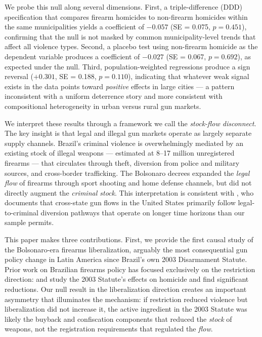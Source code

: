 \documentclass[12pt]{article}
\begin{document}
We probe this null along several dimensions. First, a triple-difference (DDD) specification that compares firearm homicides to non-firearm homicides within the same municipalities yields a coefficient of $-0.057$ (SE = 0.075, $p = 0.451$), confirming that the null is not masked by common municipality-level trends that affect all violence types. Second, a placebo test using non-firearm homicide as the dependent variable produces a coefficient of $-0.027$ (SE = 0.067, $p = 0.692$), as expected under the null. Third, population-weighted regressions produce a sign reversal ($+0.301$, SE = 0.188, $p = 0.110$), indicating that whatever weak signal exists in the data points toward \textit{positive} effects in large cities --- a pattern inconsistent with a uniform deterrence story and more consistent with compositional heterogeneity in urban versus rural gun markets.

We interpret these results through a framework we call the \textit{stock-flow disconnect}. The key insight is that legal and illegal gun markets operate as largely separate supply channels. Brazil's criminal violence is overwhelmingly mediated by an existing stock of illegal weapons --- estimated at 8--17 million unregistered firearms \citep{cerqueira2004, fbsp2022armas} --- that circulates through theft, diversion from police and military sources, and cross-border trafficking. The Bolsonaro decrees expanded the \textit{legal flow} of firearms through sport shooting and home defense channels, but did not directly augment the \textit{criminal stock}. This interpretation is consistent with \citet{knight2013guntrace}, who documents that cross-state gun flows in the United States primarily follow legal-to-criminal diversion pathways that operate on longer time horizons than our sample permits.

This paper makes three contributions. First, we provide the first causal study of the Bolsonaro-era firearms liberalization, arguably the most consequential gun policy change in Latin America since Brazil's own 2003 Disarmament Statute. Prior work on Brazilian firearms policy has focused exclusively on the restriction direction: \citet{cerqueiramello2013} and \citet{almeidahartung2021} study the 2003 Statute's effects on homicide and find significant reductions. Our null result in the liberalization direction creates an important asymmetry that illuminates the mechanism: if restriction reduced violence but liberalization did not increase it, the active ingredient in the 2003 Statute was likely the buyback and confiscation components that reduced the \textit{stock} of weapons, not the registration requirements that regulated the \textit{flow}.
\end{document}
